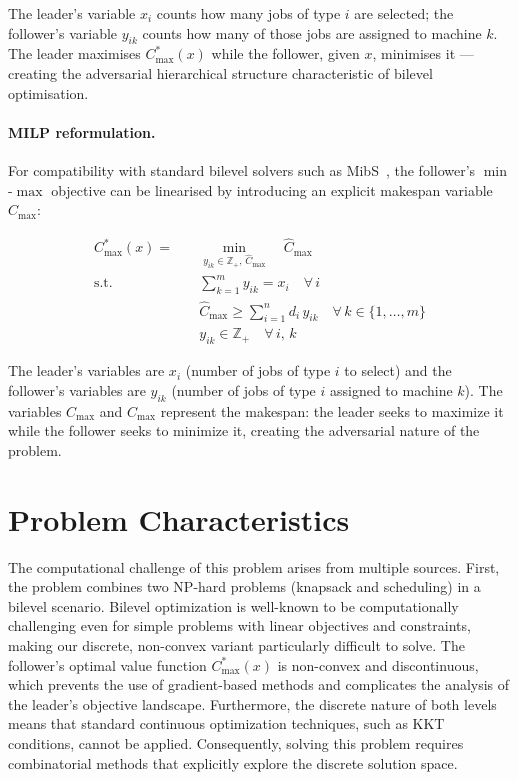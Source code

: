 The leader's variable $x_i$ counts how many jobs of type $i$ are selected; the follower's variable $y_{ik}$ counts how many of those jobs are assigned to machine $k$. The leader maximises $C_{\max}^*(x)$ while the follower, given $x$, minimises it — creating the adversarial hierarchical structure characteristic of bilevel optimisation.

\paragraph{MILP reformulation.}
For compatibility with standard bilevel solvers such as MibS~\cite{Tahernejad2020}, the follower's $\min$-$\max$ objective can be linearised by introducing an explicit makespan variable $\hat{C}_{\max}$:

\begin{align}
C_{\max}^*(x) = \quad & \min_{y_{ik}\in\mathbb{Z}_+,\,\hat{C}_{\max}} \quad \hat{C}_{\max} \label{eq:follower-lp}\\
\text{s.t.} \quad & \sum_{k=1}^{m} y_{ik} = x_i \quad \forall\, i \label{eq:assign-lp}\\
& \hat{C}_{\max} \geq \sum_{i=1}^{n} d_i\, y_{ik} \quad \forall\, k \in \{1, \ldots, m\} \label{eq:makespan-lp}\\
& y_{ik} \in \mathbb{Z}_+ \quad \forall\, i,\, k \nonumber
\end{align}

The leader's variables are $x_i$ (number of jobs of type $i$ to select) and the follower's variables are $y_{ik}$ (number of jobs of type $i$ assigned to machine $k$). The variables $C_{\max}$ and $\hat{C}_{\max}$ represent the makespan: the leader seeks to maximize it while the follower seeks to minimize it, creating the adversarial nature of the problem.

\section{Problem Characteristics}

The computational challenge of this problem arises from multiple sources. First, the problem combines two NP-hard problems (knapsack and scheduling) in a bilevel scenario. Bilevel optimization is well-known to be computationally challenging even for simple problems with linear objectives and constraints, making our discrete, non-convex variant particularly difficult to solve. The follower's optimal value function $C_{\max}^*(x)$ is non-convex and discontinuous, which prevents the use of gradient-based methods and complicates the analysis of the leader's objective landscape. Furthermore, the discrete nature of both levels means that standard continuous optimization techniques, such as KKT conditions, cannot be applied. Consequently, solving this problem requires combinatorial methods that explicitly explore the discrete solution space.

